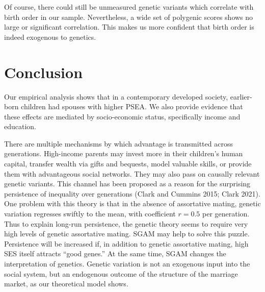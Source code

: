 \documentclass[
]{article}
\begin{document}
Of course, there could still be unmeasured genetic variants which
correlate with birth order in our sample. Nevertheless, a wide set of
polygenic scores shows no large or significant correlation. This makes
us more confident that birth order is indeed exogenous to genetics.

\hypertarget{conclusion}{%
\section{Conclusion}\label{conclusion}}

Our empirical analysis shows that in a contemporary developed society,
earlier-born children had spouses with higher PSEA. We also provide
evidence that these effects are mediated by socio-economic status, specifically
income and education.

There are multiple mechanisms by which advantage is transmitted across
generations. High-income parents may invest more in their children's human
capital, transfer wealth via gifts and bequests, model valuable skills, or
provide them with advantageous social networks. They may also pass on causally
relevant genetic variants. This channel has been proposed as a reason for the
surprising persistence of inequality over generations
(Clark and Cummins 2015; Clark 2021). One problem with this theory is
that in the absence of assortative mating, genetic variation regresses swiftly
to the mean, with coefficient \(r = 0.5\) per generation. Thus to explain long-run
persistence, the genetic theory seems to require very high levels of genetic
assortative mating. SGAM may help to solve this puzzle. Persistence will be
increased if, in addition to genetic assortative mating, high SES itself
attracts ``good genes.'' At the same time, SGAM changes the interpretation of
genetics. Genetic variation is not an exogenous input into the social system,
but an endogenous outcome of the structure of the marriage market, as our
theoretical model shows.
\end{document}
